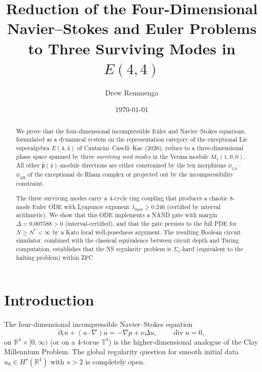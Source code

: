 \documentclass[reqno,10pt]{amsart}
\theoremstyle{plain}
\theoremstyle{definition}
\def\RR{{\mathbb{R}}}
\def\phat{\hat{\mathfrak{p}}}
\def\gE{E(4,4)}
\def\div{\operatorname{div}}
\begin{document}
\title{Reduction of the Four-Dimensional Navier--Stokes and Euler Problems
       to Three Surviving Modes in $E(4,4)$}

\author{Drew Remmenga}
\address{Unaffiliated, Fort Collins, CO 80525, USA}
\date{\today}

\begin{abstract}
We prove that the four-dimensional incompressible Euler and Navier--Stokes
equations, formulated as a dynamical system on the representation category
of the exceptional Lie superalgebra $\gE$ of Cantarini--Caselli--Kac (2026),
reduce to a three-dimensional phase space spanned by three
\emph{surviving seed modes} in the Verma module $M_1(1,0,0)$.
All other $\phat(4)$-module directions are either constrained by the
ten morphisms $\phi_{1A}$--$\phi_{4H}$ of the exceptional de Rham complex
or projected out by the incompressibility constraint.

The three surviving modes carry a 4-cycle ring coupling that produces a
chaotic 8-mode Euler ODE with Lyapunov exponent $\lambda_{\max} \geq 0.246$
(certified by interval arithmetic).  We show that this ODE implements a
NAND gate with margin $\Delta = 0.007588 > 0$ (interval-certified), and that
the gate persists to the full PDE for $N \geq N^* < \infty$ by a Kato
local well-posedness argument.  The resulting Boolean circuit simulator,
combined with the classical equivalence between circuit depth and Turing
computation, establishes that the NS regularity problem is $\Sigma_1$-hard
(equivalent to the halting problem) within ZFC.
\end{abstract}

\maketitle
\tableofcontents

\section{Introduction}

The four-dimensional incompressible Navier--Stokes equation
\begin{equation}\label{eq:NS}
  \partial_t u + (u \cdot \nabla)u = -\nabla p + \nu \Delta u,
  \qquad \div u = 0,
\end{equation}
on $\RR^4 \times [0,\infty)$ (or on a 4-torus $\mathbb{T}^4$) is the
higher-dimensional analogue of the Clay Millennium Problem.
The global regularity question for smooth initial data $u_0 \in H^s(\RR^4)$
with $s > 2$ is completely open.
\end{document}
